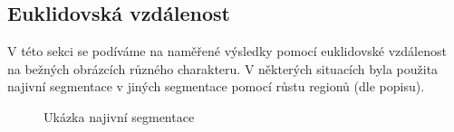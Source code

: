 \documentclass[czech, master, public, dept460, male, cpdeclaration, oneside]{diploma}
\begin{document}
\subsection{Euklidovská vzdálenost}
V této sekci se podíváme na naměřené výsledky pomocí euklidovské vzdálenost na bežných obrázcích různého charakteru. V některých situacích byla použita najivní segmentace v jiných segmentace pomocí růstu regionů (dle popisu).
\begin{figure}[H]
	\centering	
	\qquad
	\caption{Ukázka najivní segmentace}
\end{figure}
\end{document}
